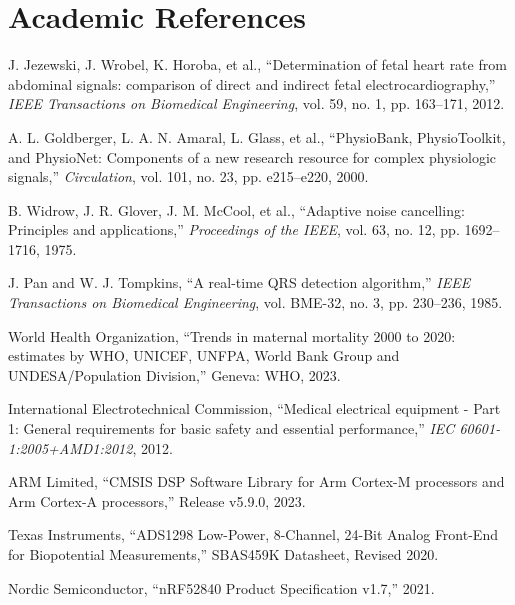 \documentclass[10pt,a4paper]{article}
\begin{document}
\section{Academic References}

\begin{enumerate}[label={[\arabic*]},leftmargin=2em]
    \item J. Jezewski, J. Wrobel, K. Horoba, et al., ``Determination of fetal heart rate from abdominal signals: comparison of direct and indirect fetal electrocardiography,'' \textit{IEEE Transactions on Biomedical Engineering}, vol. 59, no. 1, pp. 163--171, 2012.
    \item A. L. Goldberger, L. A. N. Amaral, L. Glass, et al., ``PhysioBank, PhysioToolkit, and PhysioNet: Components of a new research resource for complex physiologic signals,'' \textit{Circulation}, vol. 101, no. 23, pp. e215--e220, 2000.
    \item B. Widrow, J. R. Glover, J. M. McCool, et al., ``Adaptive noise cancelling: Principles and applications,'' \textit{Proceedings of the IEEE}, vol. 63, no. 12, pp. 1692--1716, 1975.
    \item J. Pan and W. J. Tompkins, ``A real-time QRS detection algorithm,'' \textit{IEEE Transactions on Biomedical Engineering}, vol. BME-32, no. 3, pp. 230--236, 1985.
    \item World Health Organization, ``Trends in maternal mortality 2000 to 2020: estimates by WHO, UNICEF, UNFPA, World Bank Group and UNDESA/Population Division,'' Geneva: WHO, 2023.
    \item International Electrotechnical Commission, ``Medical electrical equipment - Part 1: General requirements for basic safety and essential performance,'' \textit{IEC 60601-1:2005+AMD1:2012}, 2012.
    \item ARM Limited, ``CMSIS DSP Software Library for Arm Cortex-M processors and Arm Cortex-A processors,'' Release v5.9.0, 2023.
    \item Texas Instruments, ``ADS1298 Low-Power, 8-Channel, 24-Bit Analog Front-End for Biopotential Measurements,'' SBAS459K Datasheet, Revised 2020.
    \item Nordic Semiconductor, ``nRF52840 Product Specification v1.7,'' 2021.
\end{enumerate}
\end{document}
